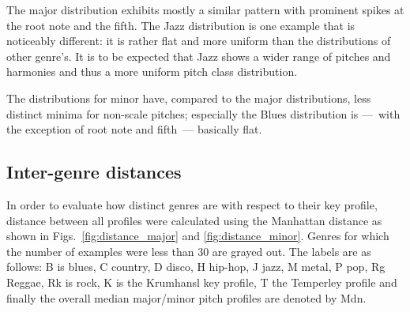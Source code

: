 \documentclass{article}
\begin{document}
The major distribution exhibits mostly a similar pattern with prominent spikes at the root note and the fifth. The Jazz distribution is one example that is noticeably different: it is rather flat and more uniform than the distributions of other genre's. It is to be expected that Jazz shows a wider range of pitches and harmonies and thus a more uniform pitch class distribution.

The distributions for minor have, compared to the major distributions, less distinct minima for non-scale pitches; especially the Blues distribution is ---~with the exception of root note and fifth~--- basically flat.

\subsection{Inter-genre distances}
In order to evaluate how distinct genres are with respect to their key profile, distance between all profiles were calculated using the Manhattan distance as shown in Figs.~\ref{fig:distance_major} and \ref{fig:distance_minor}. Genres for which the number of examples were less than 30 are grayed out. The labels are as follows: B is blues, C country, D disco, H hip-hop, J jazz, M metal, P pop, Rg Reggae, Rk is rock, K is the Krumhansl key profile, T the Temperley profile \cite{temperley_tonal_2007} and finally the overall median major/minor pitch profiles are denoted by Mdn.
\end{document}
